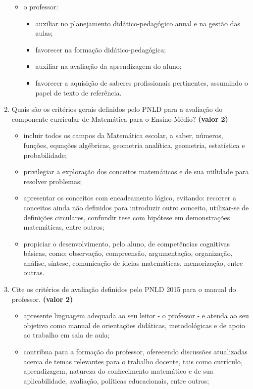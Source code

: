 \documentclass[a4paper, 12pt]{article}
\begin{document}
\begin{enumerate}
\begin{itemize}
\begin{itemize}
    \end{itemize}
  \item o professor:
    \begin{itemize}
    \item auxiliar no planejamento didático-pedagógico anual e na gestão das aulas;
    \item favorecer na formação didático-pedagógica;
    \item auxiliar na avaliação da aprendizagem do aluno;
    \item favorecer a aquisição de saberes profissionais pertinentes, assumindo o papel de texto de referência.
    \end{itemize}
  \end{itemize}
\item Quais são os critérios gerais definidos pelo PNLD para a avaliação do componente curricular de Matemática para o Ensino Médio? \textbf{(valor 2)} \\
  \begin{itemize}
  \item incluir todos os campos da Matemática escolar, a saber, números, funções, equações algébricas, geometria analítica, geometria, estatística e probabilidade;
  \item privilegiar  a  exploração  dos  conceitos  matemáticos  e  de  sua  utilidade  
para resolver problemas;
  \item apresentar os conceitos com encadeamento lógico, evitando: recorrer a conceitos ainda não definidos para introduzir outro conceito, utilizar-se de definições circulares, confundir tese com hipótese em demonstrações matemáticas, entre outros;
  \item propiciar o desenvolvimento, pelo aluno, de competências cognitivas básicas, como: observação, compreensão, argumentação, organização, análise, síntese, comunicação de ideias matemáticas, memorização, entre outras.
  \end{itemize}
\item Cite os critérios de avaliação definidos pelo PNLD 2015 para o manual do professor. \textbf{(valor 2)}
  \begin{itemize}
  \item apresente linguagem adequada ao seu leitor - o professor - e atenda ao seu objetivo como manual de orientações didáticas, metodológicas e de apoio ao trabalho em sala de aula;
  \item contribua para a formação do professor, oferecendo discussões atualizadas acerca de temas relevantes para o trabalho docente, tais como currículo,  aprendizagem,  natureza  do  conhecimento  matemático  e  de  sua aplicabilidade, avaliação, políticas educacionais, entre outros;

\end{itemize}
\end{enumerate}
\end{document}
